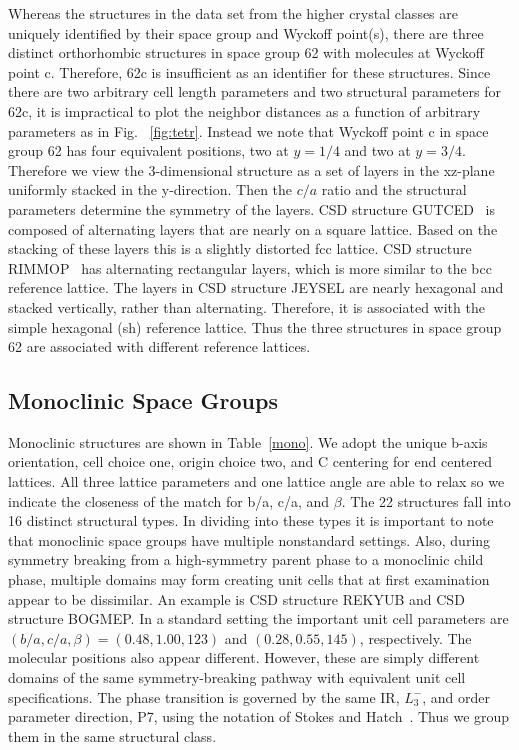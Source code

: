 \documentclass[preprint]{revtex4}              %
\begin{document}
Whereas the structures in the data set from the higher crystal
classes are uniquely identified by their space group and Wyckoff
point(s), there are three distinct orthorhombic structures in space
group 62 with molecules at Wyckoff point c.  Therefore, 62c is
insufficient as an identifier for these structures.  Since there are
two arbitrary cell length parameters and two structural parameters
for 62c, it is impractical to plot the neighbor distances as a
function of
arbitrary parameters as in Fig.\ %
\ref{fig:tetr}.  Instead we note that Wyckoff point c in space group
62 has four equivalent positions, two at $y=1/4$ and two at $y=3/4$.
Therefore we view the 3-dimensional structure as a set of layers in
the xz-plane uniformly stacked in the y-direction. Then the $c/a$
ratio and the structural parameters determine the symmetry of the
layers. CSD structure GUTCED~\cite{Dahl03} is composed of
alternating layers that are nearly on a square lattice. Based on the
stacking of these layers this is a slightly distorted fcc lattice.
CSD structure RIMMOP~\cite{Dahl03} has alternating rectangular
layers, which is more similar to the bcc reference lattice. The
layers in CSD structure JEYSEL are nearly hexagonal and stacked
vertically, rather than alternating. Therefore, it is associated
with the simple hexagonal (sh) reference lattice.  Thus the three
structures in space group 62 are associated with different reference
lattices.

\subsection{Monoclinic Space Groups}

Monoclinic structures are shown in Table~\ref{mono}. We adopt the
unique b-axis orientation, cell choice one, origin choice two, and C
centering for end centered lattices. All three lattice parameters
and one lattice angle are able to relax so we indicate the closeness
of the match for b/a, c/a, and $\beta$. The 22 structures fall into
16 distinct structural types. In dividing into these types it is
important to note that monoclinic space groups have multiple
nonstandard settings. Also, during symmetry breaking from a
high-symmetry parent phase to a monoclinic child phase, multiple
domains may form creating unit cells that at first examination
appear to be dissimilar.  An example is CSD structure REKYUB and CSD
structure BOGMEP.  In a standard setting the important unit cell
parameters are $(b/a,c/a,\beta)=(0.48,1.00,123)$ and
$(0.28,0.55,145)$, respectively. The molecular positions also appear
different. However, these are simply different domains of the same
symmetry-breaking pathway with equivalent unit cell specifications.
The phase transition is governed by the same IR, $L_3^-$, and order
parameter direction, P7, using the notation of Stokes and
Hatch~\cite{Stokes02b}. Thus we group them in the same structural
class.
\end{document}
